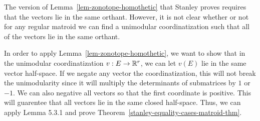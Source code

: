 \documentclass{puthesis-UG}
\begin{document}
\begin{remark}
	The version of Lemma~\ref{lem-zonotope-homothetic} that Stanley proves requires that the vectors lie in the same orthant. However, it is not clear whether or not for any regular matroid we can find a unimodular coordinatization such that all of the vectors lie in the same orthant. 
\end{remark}

In order to apply Lemma~\ref{lem-zonotope-homothetic}, we want to show that in the unimodular coordinatization $v : E \to \mathbb{R}^r$, we can let $v(E)$ lie in the same vector half-space. If we negate any vector the coordinatization, this will not break the unimodularity since it will multiply the determinants of submatrices by $1$ or $-1$. We can also negative all vectors so that the first coordinate is positive. This will guarentee that all vectors lie in the same closed half-space. Thus, we can apply Lemma 5.3.1 and prove Theorem~\ref{stanley-equality-cases-matroid-thm}. 
\end{document}
